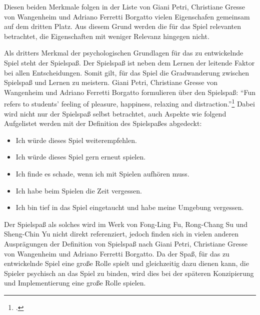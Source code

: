	Diesen beiden Merkmale folgen in der Liste von Giani Petri, Christiane Gresse von Wangenheim und Adriano Ferretti Borgatto vielen Eigenschafen gemeinsam auf dem dritten Platz. Aus diesem Grund werden die für das Spiel relevanten betrachtet, die Eigenschaften mit weniger Relevanz hingegen nicht.

	Als dritters Merkmal der psychologischen Grundlagen für das zu entwickelnde Spiel steht der Spielspaß. Der Spielspaß ist neben dem Lernen der leitende Faktor bei allen Entscheidungen. Somit gilt, für das Spiel die Gradwanderung zwischen Spielspaß und Lernen zu meistern.
	Giani Petri, Christiane Gresse von Wangenheim und Adriano Ferretti Borgatto formulieren über den Spielspaß:
	\enquote{Fun refers to students' feeling of pleasure, happiness, relaxing and distraction.}\footcite{psych3}
	Dabei wird nicht nur der Spielspaß selbst betrachtet, auch Aspekte wie folgend Aufgelistet werden mit der Definition des Spielspaßes abgedeckt:
	\begin{itemize}
		\item{Ich würde dieses Spiel weiterempfehlen.}
		\item{Ich würde dieses Spiel gern erneut spielen.}
		\item{Ich finde es schade, wenn ich mit Spielen aufhören muss.}
		\item{Ich habe beim Spielen die Zeit vergessen.}
		\item{Ich bin tief in das Spiel eingetaucht und habe meine Umgebung vergessen.}
	\end{itemize}
	Der Spielspaß als solches wird im Werk von Fong-Ling Fu, Rong-Chang Su und Sheng-Chin Yu nicht direkt referenziert, jedoch finden sich in vielen anderen Ausprägungen der Definition von Spielspaß nach Giani Petri, Christiane Gresse von Wangenheim und Adriano Ferretti Borgatto.
	Da der Spaß, für das zu entwickelnde Spiel eine große Rolle spielt und gleichzeitig dazu dienen kann, die Spieler psychisch an das Spiel zu binden, wird dies bei der späteren Konzipierung und Implementierung eine große Rolle spielen.

